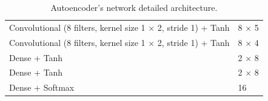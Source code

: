 \begin{table}[tp!]
\begin{adjustbox}{width=0.9\columnwidth,center}
\begin{tabular}{|l|l|}
			Convolutional (8 filters, kernel size 1 $\times$ 2, stride 1) + Tanh 	&   8 $\times$ 5		\\
			Convolutional (8 filters, kernel size 1 $\times$ 2, stride 1) + Tanh 	&   8 $\times$ 4		\\
			Dense + Tanh															&	2 $\times$ 8		\\
			Dense + Tanh															&	2 $\times$ 8		\\
			Dense + Softmax															&	16					\\ 
			\hline
		\end{tabular}
	\end{adjustbox}
	\caption{Autoencoder's network detailed architecture.}
	\label{table:autoencoder_structure}
\end{table}